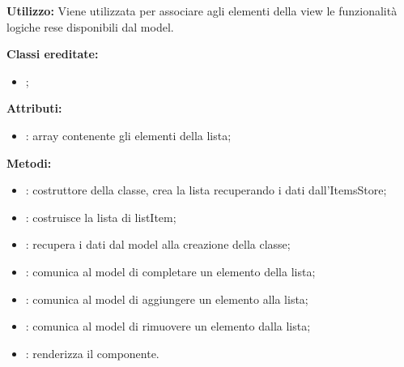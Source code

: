 \textbf{Utilizzo:}
Viene utilizzata per associare agli elementi della view le funzionalità logiche rese disponibili dal model.

\textbf{Classi ereditate:}
\begin{itemize}
	\item {};
\end{itemize}

\textbf{Attributi:}
\begin{itemize}
	\item {}: array contenente gli elementi della lista;
\end{itemize}

\textbf{Metodi:}
\begin{itemize}
	\item {}: costruttore della classe, crea la lista recuperando i dati dall'ItemsStore;
	\item {}: costruisce la lista di listItem;
	\item {}: recupera i dati dal model alla creazione della classe;
	\item {}: comunica al model di completare un elemento della lista;
	\item {}: comunica al model di aggiungere un elemento alla lista;
	\item {}: comunica al model di rimuovere un elemento dalla lista;
	\item {}: renderizza il componente.
\end{itemize}
